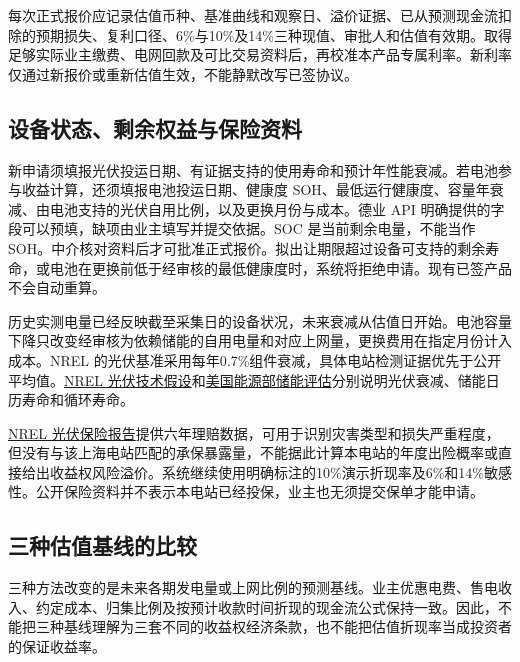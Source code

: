 \documentclass[12pt,a4paper]{article}
\begin{document}
\par{}\par
每次正式报价应记录估值币种、基准曲线和观察日、溢价证据、已从预测现金流扣除的预期损失、复利口径、6\%与10\%及14\%三种现值、审批人和估值有效期。取得足够实际业主缴费、电网回款及可比交易资料后，再校准本产品专属利率。新利率仅通过新报价或重新估值生效，不能静默改写已签协议。

\subsection{设备状态、剩余权益与保险资料}
新申请须填报光伏投运日期、有证据支持的使用寿命和预计年性能衰减。若电池参与收益计算，还须填报电池投运日期、健康度 SOH、最低运行健康度、容量年衰减、由电池支持的光伏自用比例，以及更换月份与成本。德业 API 明确提供的字段可以预填，缺项由业主填写并提交依据。SOC 是当前剩余电量，不能当作 SOH。中介核对资料后才可批准正式报价。拟出让期限超过设备可支持的剩余寿命，或电池在更换前低于经审核的最低健康度时，系统将拒绝申请。现有已签产品不会自动重算。

历史实测电量已经反映截至采集日的设备状况，未来衰减从估值日开始。电池容量下降只改变经审核为依赖储能的自用电量和对应上网量，更换费用在指定月份计入成本。NREL 的光伏基准采用每年0.7\%组件衰减，具体电站检测证据优先于公开平均值。\href{https://atb.nrel.gov/electricity/2024b/residential_pv}{NREL 光伏技术假设}和\href{https://www.energy.gov/cmei/2022-grid-energy-storage-technology-cost-and-performance-assessment}{美国能源部储能评估}分别说明光伏衰减、储能日历寿命和循环寿命。

\href{https://www.nrel.gov/docs/fy21osti/78588.pdf}{NREL 光伏保险报告}提供六年理赔数据，可用于识别灾害类型和损失严重程度，但没有与该上海电站匹配的承保暴露量，不能据此计算本电站的年度出险概率或直接给出收益权风险溢价。系统继续使用明确标注的10\%演示折现率及6\%和14\%敏感性。公开保险资料并不表示本电站已经投保，业主也无须提交保单才能申请。

\subsection{三种估值基线的比较}
三种方法改变的是未来各期发电量或上网比例的预测基线。业主优惠电费、售电收入、约定成本、归集比例及按预计收款时间折现的现金流公式保持一致。因此，不能把三种基线理解为三套不同的收益权经济条款，也不能把估值折现率当成投资者的保证收益率。
\end{document}
